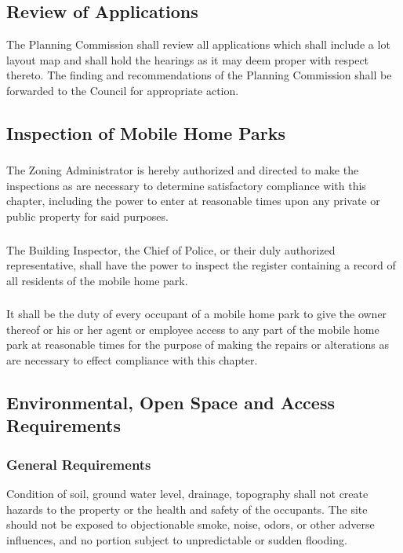 \subsection{Review of Applications}
The Planning Commission shall review all applications which shall include a lot layout map and shall hold the hearings as it may deem proper with respect thereto. The finding and recommendations of the Planning Commission shall be forwarded to the Council for appropriate action.
\subsection{Inspection of Mobile Home Parks}
\subsubsection{}
The Zoning Administrator is hereby authorized and directed to make the inspections as are necessary to determine satisfactory compliance with this chapter, including the power to enter at reasonable times upon any private or public property for said purposes.
\subsubsection{}
The Building Inspector, the Chief of Police, or their duly authorized representative, shall have the power to inspect the register containing a record of all residents of the mobile home park.
\subsubsection{}
It shall be the duty of every occupant of a mobile home park to give the owner thereof or his or her agent or employee access to any part of the mobile home park at reasonable times for the purpose of making the repairs or alterations as are necessary to effect compliance with this chapter.
\subsection{Environmental, Open Space and Access Requirements}
\subsubsection{General Requirements}
Condition of soil, ground water level, drainage, topography shall not create hazards to the property or the health and safety of the occupants. The site should not be exposed to objectionable smoke, noise, odors, or other adverse influences, and no portion subject to unpredictable or sudden flooding.
